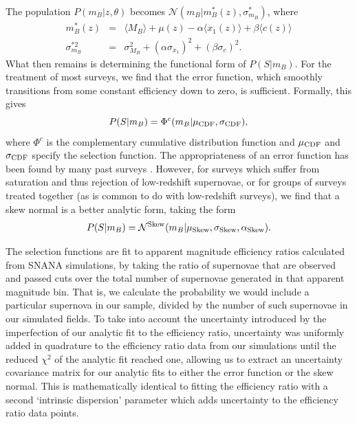 \documentclass[twocolumn,trackchanges,tighten]{aastex62}
\begin{document}
The population $P(m_B | z, \theta)$ becomes $\mathcal{N}(m_B|m_B^*(z), \sigma^*_{m_B})$, where
\begin{eqnarray}
m_B^*(z) &=& \langle M_B \rangle + \mu(z) - \alpha \langle x_1(z) \rangle + \beta \langle c(z) \rangle \\
\sigma^{*2}_{m_B} &=& \sigma_{M_B}^2 + (\alpha \sigma_{x_1})^2 + (\beta \sigma_c)^2.
\end{eqnarray}
What then remains is determining the functional form of $P(S|m_B)$. For the treatment of most surveys, we find that the error function, which smoothly transitions from some constant efficiency down to zero, is sufficient. Formally, this gives
\begin{equation}
P(S|m_B) = \Phi^c(m_B | \mu_{\rm CDF}, \sigma_{\rm CDF}), \label{eq:selcdf}
\end{equation}
where $\Phi^c$ is the complementary cumulative distribution function and $\mu_{\rm CDF}$ and $\sigma_{\rm CDF}$ specify the selection function. The appropriateness of an error function has been found by many past surveys \citep{Dilday2008, Barbary2010, Perrett2012, Graur2013, Rodney2014}. However, for surveys which suffer from saturation and thus rejection of low-redshift supernovae, or for groups of surveys treated together (as is common to do with low-redshift surveys), we find that a skew normal is a better analytic form, taking the form
\begin{equation}
P(S|m_B) = \mathcal{N}^{{\rm Skew}}(m_B | \mu_{\rm Skew}, \sigma_{\rm Skew}, \alpha_{\rm Skew}). \label{eq:selnorm}
\end{equation}

The selection functions are fit to apparent magnitude efficiency ratios calculated from SNANA simulations, by taking the ratio of supernovae that are observed and passed cuts over the total number of supernovae generated in that apparent magnitude bin. That is, we calculate the probability we would include a particular supernova in our sample, divided by the number of such supernovae in our simulated fields. To take into account the uncertainty introduced by the imperfection of our analytic fit to the efficiency ratio, uncertainty was uniformly added in quadrature to the efficiency ratio data from our simulations until the reduced $\chi^2$ of the analytic fit reached one, allowing us to extract an uncertainty covariance matrix for our analytic fits to either the error function or the skew normal. This is mathematically identical to fitting the efficiency ratio with a second `intrinsic dispersion' parameter which adds uncertainty to the efficiency ratio data points.
\end{document}
